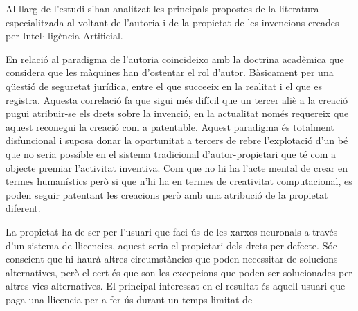 \documentclass[12pt]{article}
\begin{document}
\vspace{\baselineskip}
\begin{justify}
Al llarg de l’estudi s’han analitzat les principals propostes de la literatura especialitzada al voltant de l’autoria i de la propietat de les invencions creades per Intel$ \cdot $ ligència Artificial.
\end{justify}\par


\vspace{\baselineskip}
\begin{justify}
En relació al paradigma de l’autoria coincideixo amb la doctrina acadèmica que considera que les màquines han d’ostentar el rol d’autor. Bàsicament per una qüestió de seguretat jurídica, entre el que succeeix en la realitat i el que es registra. Aquesta correlació fa que sigui més difícil que un tercer aliè a la creació pugui atribuir-se els drets sobre la invenció, en la actualitat només requereix que aquest reconegui la creació com a patentable. Aquest paradigma és totalment disfuncional i suposa donar la oportunitat a tercers de rebre l’explotació d’un bé que no seria possible en el sistema tradicional d’autor-propietari que té com a objecte premiar l’activitat inventiva. Com que no hi ha l’acte mental de crear en termes humanístics però si que n’hi ha en termes de creativitat computacional, es poden seguir patentant les creacions però amb una atribució de la propietat diferent.
\end{justify}\par


\vspace{\baselineskip}
\begin{justify}
La propietat ha de ser per l’usuari que faci ús de les xarxes neuronals a través d’un sistema de llicencies, aquest seria el propietari dels drets per defecte. Sóc conscient que hi haurà altres circumstàncies que poden necessitar de solucions alternatives, però el cert és que son les excepcions que poden ser solucionades per altres vies alternatives. El principal interessat en el resultat és aquell usuari que paga una llicencia per a fer ús durant un temps limitat de 
\end{justify}\par


\vspace{\baselineskip}

\vspace{\baselineskip}

\vspace{\baselineskip}
\end{document}
